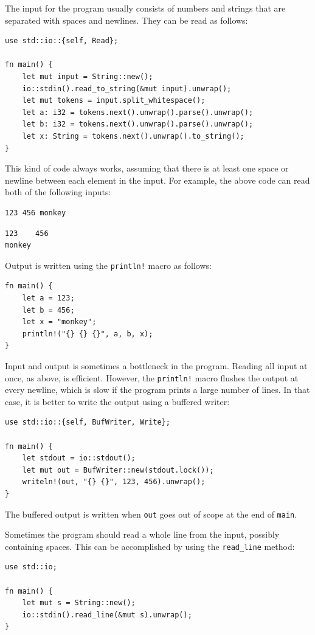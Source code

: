 The input for the program usually consists of
numbers and strings that are separated with
spaces and newlines.
They can be read as follows:

\begin{lstlisting}
use std::io::{self, Read};

fn main() {
    let mut input = String::new();
    io::stdin().read_to_string(&mut input).unwrap();
    let mut tokens = input.split_whitespace();
    let a: i32 = tokens.next().unwrap().parse().unwrap();
    let b: i32 = tokens.next().unwrap().parse().unwrap();
    let x: String = tokens.next().unwrap().to_string();
}
\end{lstlisting}

This kind of code always works,
assuming that there is at least one space
or newline between each element in the input.
For example, the above code can read
both of the following inputs:
\begin{lstlisting}
123 456 monkey
\end{lstlisting}
\begin{lstlisting}
123    456
monkey
\end{lstlisting}
Output is written using the \texttt{println!} macro
as follows:
\begin{lstlisting}
fn main() {
    let a = 123;
    let b = 456;
    let x = "monkey";
    println!("{} {} {}", a, b, x);
}
\end{lstlisting}

Input and output is sometimes
a bottleneck in the program.
Reading all input at once, as above, is efficient.
However, the \texttt{println!} macro
flushes the output at every newline,
which is slow if the program prints
a large number of lines.
In that case, it is better to write the output
using a buffered writer:

\begin{lstlisting}
use std::io::{self, BufWriter, Write};

fn main() {
    let stdout = io::stdout();
    let mut out = BufWriter::new(stdout.lock());
    writeln!(out, "{} {}", 123, 456).unwrap();
}
\end{lstlisting}

The buffered output is written when \texttt{out}
goes out of scope at the end of \texttt{main}.

Sometimes the program should read a whole line
from the input, possibly containing spaces.
This can be accomplished by using the
\texttt{read\_line} method:

\begin{lstlisting}
use std::io;

fn main() {
    let mut s = String::new();
    io::stdin().read_line(&mut s).unwrap();
}
\end{lstlisting}

